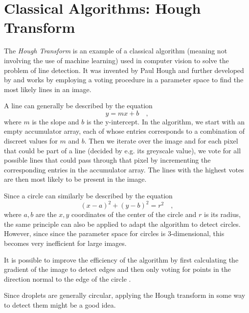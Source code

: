 \section{Classical Algorithms: Hough Transform}

The \emph{Hough Transform} is an example of a classical algorithm (meaning not involving the use of machine learning) used in computer vision to solve the problem of line detection.  
It was invented by Paul Hough \cite{houghMachineAnalysisBubble1959} and further developed by  \cite{dudaUseHoughTransformation1972} and works by employing a voting procedure in a parameter space to find the most likely lines in an image.

A line can generally be described by the equation 
$$
    y = mx + b\quad ,
$$
where $m$ is the slope and $b$ is the y-intercept. 
In the algorithm, we start with an empty accumulator array, each of whose entries corresponds to a combination of discreet values for $m$ and $b$.
Then we iterate over the image and for each pixel that could be part of a line (decided by e.g. its greyscale value), we vote for all possible lines that could pass through that pixel by incrementing the corresponding entries in the accumulator array.
The lines with the highest votes are then most likely to be present in the image.

Since a circle can similarly be described by the equation
$$
(x - a)^2 + (y - b)^2 = r^2\quad ,
$$
where $a,b$ are the $x,y$ coordinates of the center of the circle and $r$ is its radius, the same principle can also be applied to adapt the algorithm to detect circles.
However, since since the parameter space for circles is 3-dimensional, this becomes very inefficient for large images.

It is possible to improve the efficiency of the algorithm by first calculating the gradient of the image to detect edges and then only voting for points in the direction normal to the edge of the circle \cite{yuenComparativeStudyHough1989,kierkegaardMethodDetectionCircular1992}.

Since droplets are generally circular, applying the Hough transform in some way to detect them might be a good idea.
